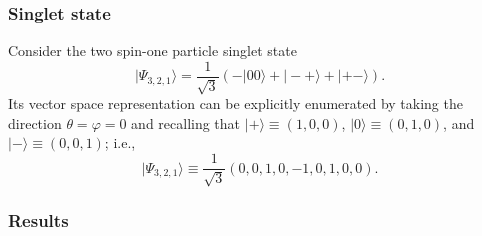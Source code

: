 \documentclass[pra,amsfonts,showpacs,showkeys,preprint]{revtex4}
\begin{document}
\subsubsection*{Singlet state}

Consider the two spin-one particle singlet state
\begin{equation}
\label{2009-gtq-s1}
\vert \Psi_{3,2,1} \rangle  =  \frac{1}{\sqrt{3}}\left(-|00\rangle + |-+\rangle + |+-\rangle \right)
.
\end{equation}
Its vector space representation can be explicitly enumerated by taking the direction $\theta =\varphi =0$ and recalling that
$\vert +\rangle \equiv (1,0,0)$,
$\vert 0\rangle \equiv (0,1,0)$, and
$\vert -\rangle \equiv (0,0,1)$; i.e.,
\begin{equation}
\label{2009-gtq-s1ef}
\vert \Psi_{3,2,1} \rangle  \equiv  \frac{1}{\sqrt{3}}\left(0,0,1,0,-1,0,1,0,0 \right)
.
\end{equation}

\subsubsection*{Results}
\end{document}
